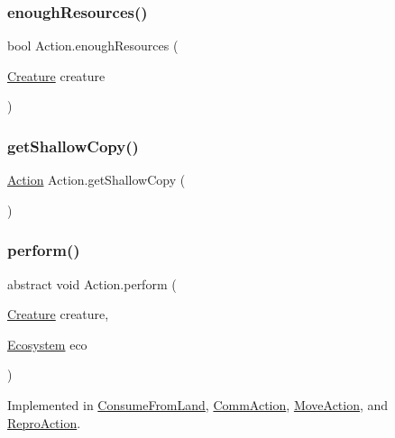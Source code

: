 \subsubsection{\texorpdfstring{enough\+Resources()}{enoughResources()}}
{\footnotesize\ttfamily bool Action.\+enough\+Resources (\begin{DoxyParamCaption}\item[{\mbox{\hyperlink{class_creature}{Creature}}}]{creature }\end{DoxyParamCaption})}

\mbox{\label{class_action_a0c5e2efad9169883c02a215679d0b8be}} 
\subsubsection{\texorpdfstring{get\+Shallow\+Copy()}{getShallowCopy()}}
{\footnotesize\ttfamily \mbox{\hyperlink{class_action}{Action}} Action.\+get\+Shallow\+Copy (\begin{DoxyParamCaption}{ }\end{DoxyParamCaption})}

\mbox{\label{class_action_a2aedfc3be16448fbf224cb13607de3c0}} 
\subsubsection{\texorpdfstring{perform()}{perform()}}
{\footnotesize\ttfamily abstract void Action.\+perform (\begin{DoxyParamCaption}\item[{\mbox{\hyperlink{class_creature}{Creature}}}]{creature,  }\item[{\mbox{\hyperlink{class_ecosystem}{Ecosystem}}}]{eco }\end{DoxyParamCaption})\hspace{0.3cm}{\ttfamily [pure virtual]}}



Implemented in \mbox{\hyperlink{class_consume_from_land_a05e266fe8dd4d68b7bec63f53a7f513b}{Consume\+From\+Land}}, \mbox{\hyperlink{class_comm_action_a4ea8e9bcc0a5060221efdc6afefa4355}{Comm\+Action}}, \mbox{\hyperlink{class_move_action_a259b4b4542e7f72df322e060d7737f71}{Move\+Action}}, and \mbox{\hyperlink{class_repro_action_ab018325092d2a13cf333a8576c7f9dd0}{Repro\+Action}}.

